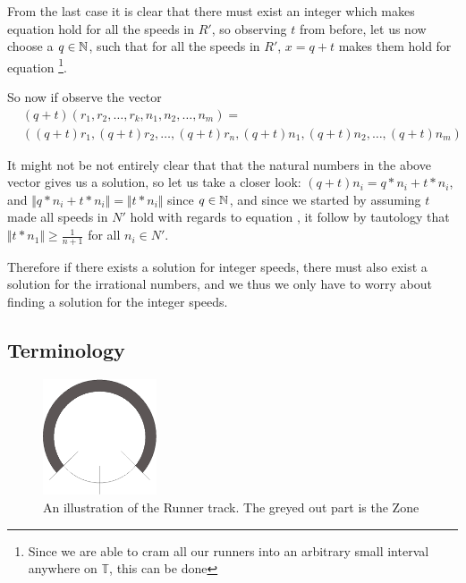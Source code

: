 \begin{description}
From the last case it is clear that there must exist an integer which makes equation  hold for all the speeds in $R\prime$, so observing $t$ from before, let us now choose a $q \in \mathbb{N}$, such that for all the speeds in $R\prime$, $x = q + t$ makes them hold for equation \footnote{Since we are able to cram all our runners into an arbitrary small interval anywhere on $\mathbb{T}$, this can be done}.

So now if observe the vector 
\begin{equation}
\begin{split}
&(q + t)(r_1, r_2, \ldots, r_k, n_1, n_2, \ldots, n_m) =\\ 
&((q + t)r_1, (q + t)r_2, \ldots, (q + t)r_n, (q + t)n_1, (q + t)n_2, \ldots, (q + t)n_m) 
\end{split}
\end{equation}

It might not be not entirely clear that that the natural numbers in the above vector gives us a solution, so let us take a closer look: 
$(q + t)n_i = q * n_i + t * n_i$, and $\Vert q * n_i + t * n_i \Vert = \Vert t * n_i \Vert$ since $q \in \mathbb{N}$, and since we started by assuming $t$ made all speeds in $N\prime$ hold with regards to equation , it follow by tautology that $\Vert t * n_1 \Vert \geq \frac{1}{n+1}$ for all $n_i \in N\prime$.

Therefore if there exists a solution for integer speeds, there must also exist a solution for the irrational numbers, and we thus we only have to worry about finding a solution for the integer speeds.
\end{description}

\subsection{Terminology}
\label{Termonolgy}
\begin{figure}[H]
  \centering
  \includegraphics[width=0.3\textwidth, angle=90]{./images/circleZoneEPS}
  \caption{\label{circleZoneImg}An illustration of the Runner track. The greyed out part is the Zone}
\end{figure}

